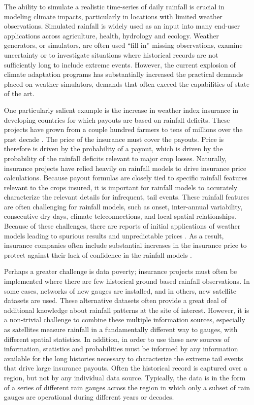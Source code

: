 \documentclass[11pt]{article}
\begin{document}
The ability to simulate a realistic time-series of daily rainfall is crucial in modeling climate impacts, particularly in locations with limited weather observations.   Simulated rainfall is widely used as an input into many end-user applications across agriculture, health, hydrology and ecology.  Weather generators, or simulators, are often used ``fill in'' missing observations, examine uncertainty or to investigate situations where historical records are not sufficiently long to include extreme events.  However, the current explosion of climate adaptation programs has substantially increased the practical demands placed on weather simulators, demands that often exceed the capabilities of state of the art.  

One particularly salient example is the increase in weather index insurance in developing countries for which payouts are based on rainfall deficits.  These projects have grown from a couple hundred farmers to tens of millions over the past decade \cite{Greatrex2015}.   The price of the insurance must cover the payouts.  Price is therefore is driven by the probability of a payout, which is driven by the probability of the rainfall deficits relevant to major crop losses. Naturally, insurance projects have relied heavily on rainfall models to drive insurance price calculations.  Because payout formulas are closely tied to specific rainfall features relevant to the crops insured, it is important for rainfall models to accurately characterize the relevant details for infrequent, tail events.  These rainfall features are often challenging for rainfall models, such as onset, inter-annual variability, consecutive dry days, climate teleconnections, and local spatial relationships. Because of these challenges, there are reports of initial applications of weather models leading to spurious results and unpredictable prices \cite{Giannini2009}.  As a result, insurance companies often include substantial increases in the insurance price to protect against their lack of confidence in the rainfall models \cite{Osgood2012}.

Perhaps a greater challenge is data poverty;  insurance projects must often be implemented where there are few historical ground based rainfall observations.  In some cases, networks of new gauges are installed, and in others, new satellite datasets are used.  These alternative datasets often provide a great deal of additional knowledge about rainfall patterns at the site of interest.  However, it is a non-trivial challenge to combine these multiple information sources, especially as satellites measure rainfall in a fundamentally different way to gauges, with different spatial statistics.  In addition, in order to use these new sources of information, statistics and probabilities must be informed by any information available for the long histories necessary to characterize the extreme tail events that drive large insurance payouts. Often the historical record is captured over a region, but not by any individual data source.  Typically, the data is in the form of a series of different rain gauges across the region in which only a subset of rain gauges are operational during different years or decades.
\end{document}
